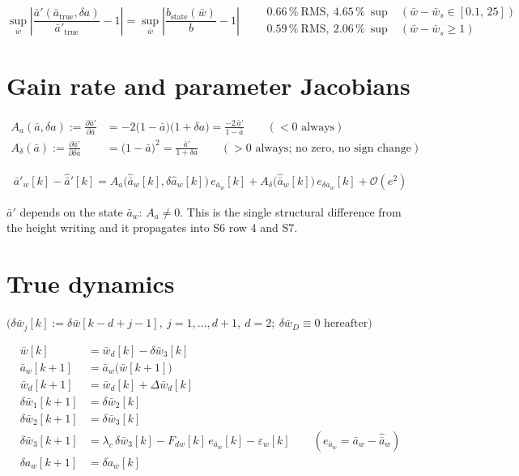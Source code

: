 \documentclass[11pt,a4paper,fontset=none]{ctexart}
\begin{document}
\begin{equation*}
\sup_{\bar{w}}\left|\frac{\bar{a}'(\bar{a}_{\mathrm{true}},\delta a)}
{\bar{a}'_{\mathrm{true}}} - 1\right|
= \sup_{\bar{w}}\left|\frac{b_{\mathrm{state}}(\bar{w})}{b} - 1\right|
\qquad
\begin{array}{ll}
0.66\,\%\ \mathrm{RMS},\ 4.65\,\%\ \sup & (\bar{w}-\bar{w}_s \in [0.1,\,25])\\
0.59\,\%\ \mathrm{RMS},\ 2.06\,\%\ \sup & (\bar{w}-\bar{w}_s \ge 1)
\end{array}
\end{equation*}

\section{Gain rate and parameter Jacobians}

\begin{align*}
A_a(\bar{a},\delta a) := \frac{\partial\bar{a}'}{\partial\bar{a}}
  &= -2\bigl(1-\bar{a}\bigr)\bigl(1+\delta a\bigr) = \frac{-2\,\bar{a}'}{1-\bar{a}}
  \qquad (<0 \text{ always}) \\[0.3em]
A_{\delta}(\bar{a}) := \frac{\partial\bar{a}'}{\partial\delta a}
  &= \bigl(1-\bar{a}\bigr)^{2} = \frac{\bar{a}'}{1+\delta a}
  \qquad (>0 \text{ always; no zero, no sign change})
\end{align*}

\begin{align*}
\bar{a}'_w[k] - \hat{\bar{a}}'[k]
  = A_a\bigl(\hat{\bar{a}}_w[k],\delta\hat{a}_w[k]\bigr)\, e_{\bar{a}_w}[k]
  + A_{\delta}\bigl(\hat{\bar{a}}_w[k]\bigr)\, e_{\delta a_w}[k]
  + \mathcal{O}(e^{2})
\end{align*}

$\bar{a}'$ depends on the state $\bar{a}_w$: $A_a \neq 0$.  This is the single
structural difference from the height writing and it propagates into S6 row 4
and S7.

\section{True dynamics}

$\bigl(\delta\bar{w}_j[k] := \delta\bar{w}[k-d+j-1],\ j = 1,\dots,d+1,\
d = 2;\ \delta\bar{w}_D \equiv 0 \text{ hereafter}\bigr)$

\begin{align*}
\bar{w}[k] &= \bar{w}_d[k] - \delta\bar{w}_3[k] \\
\bar{a}_w[k+1] &= \bar{a}_w\bigl(\bar{w}[k+1]\bigr) \\
\bar{w}_d[k+1] &= \bar{w}_d[k] + \Delta\bar{w}_d[k] \\
\delta\bar{w}_1[k+1] &= \delta\bar{w}_2[k] \\
\delta\bar{w}_2[k+1] &= \delta\bar{w}_3[k] \\
\delta\bar{w}_3[k+1] &= \lambda_c\,\delta\bar{w}_3[k]
  - F_{dw}[k]\,e_{\bar{a}_w}[k] - \varepsilon_w[k]
  \qquad (e_{\bar{a}_w} = \bar{a}_w - \hat{\bar{a}}_w) \\
\delta a_w[k+1] &= \delta a_w[k]
\end{align*}
\end{document}
